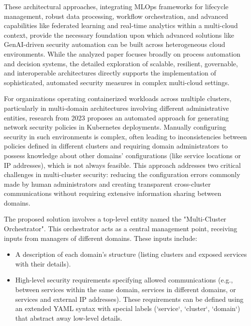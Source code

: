 These architectural approaches, integrating MLOps frameworks for lifecycle management, robust data processing, workflow orchestration, and advanced capabilities like federated learning and real-time analytics within a multi-cloud context, provide the necessary foundation upon which advanced solutions like GenAI-driven security automation can be built across heterogeneous cloud environments\cite{sushil_prabhu_prabhakaran_integration_2024}. While the analyzed paper focuses broadly on process automation and decision systems, the detailed exploration of scalable, resilient, governable, and interoperable architectures directly supports the implementation of sophisticated, automated security measures in complex multi-cloud settings\cite{sushil_prabhu_prabhakaran_integration_2024}.

For organizations operating containerized workloads across multiple clusters, particularly in multi-domain architectures involving different administrative entities, research from 2023 proposes an automated approach for generating network security policies in Kubernetes deployments\cite{bringhenti_security_2023}. Manually configuring security in such environments is complex, often leading to inconsistencies between policies defined in different clusters and requiring domain administrators to possess knowledge about other domains' configurations (like service locations or IP addresses), which is not always feasible\cite{bringhenti_security_2023}. This approach addresses two critical challenges in multi-cluster security: reducing the configuration errors commonly made by human administrators and creating transparent cross-cluster communications without requiring extensive information sharing between domains\cite{bringhenti_security_2023}.

The proposed solution involves a top-level entity named the "Multi-Cluster Orchestrator"\cite{bringhenti_security_2023}. This orchestrator acts as a central management point, receiving inputs from managers of different domains\cite{bringhenti_security_2023}. These inputs include:
\begin{itemize}
    \item A description of each domain's structure (listing clusters and exposed services with their details)\cite{bringhenti_security_2023}.
    \item High-level security requirements specifying allowed communications (e.g., between services within the same domain, services in different domains, or services and external IP addresses)\cite{bringhenti_security_2023}. These requirements can be defined using an extended YAML syntax with special labels (`service`, `cluster`, `domain`) that abstract away low-level details\cite{bringhenti_security_2023}.
\end{itemize}

